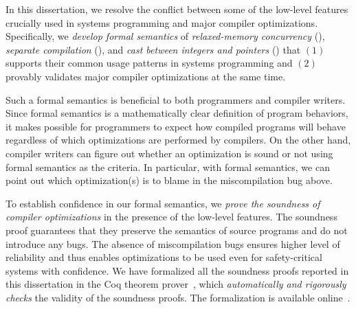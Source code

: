 In this dissertation, we resolve the conflict between some of the low-level features crucially used
in systems programming and major compiler optimizations.  Specifically, we \emph{develop formal
  semantics} of \emph{relaxed-memory concurrency} (), \emph{separate compilation}
(), and \emph{cast between integers and pointers} () that
$(1)$ supports their common usage patterns in systems programming and $(2)$ provably validates major
compiler optimizations at the same time.



Such a formal semantics is beneficial to both programmers and compiler writers.  Since formal
semantics is a mathematically clear definition of program behaviors, it makes possible for
programmers to expect how compiled programs will behave regardless of which optimizations are
performed by compilers.  On the other hand, compiler writers can figure out whether an optimization
is sound or not using formal semantics as the criteria.  In particular, with formal semantics, we
can point out which optimization(s) is to blame in the miscompilation bug above.

To establish confidence in our formal semantics, we \emph{prove the soundness of compiler
  optimizations} in the presence of the low-level features.  The soundness proof guarantees that
they preserve the semantics of source programs and do not introduce any bugs.  The absence of
miscompilation bugs ensures higher level of reliability and thus enables optimizations to be used
even for safety-critical systems with confidence.  We have formalized all the soundness proofs
reported in this dissertation in the Coq theorem prover~\cite{coq}, which \emph{automatically and
  rigorously checks} the validity of the soundness proofs.  The formalization is available
online~\cite{kang-phd-thesis-web}.



\paragraph*{}

